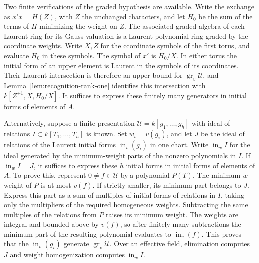 \documentclass[11pt,reqno]{amsart}
\numberwithin{equation}{section}
\theoremstyle{definition}
\theoremstyle{remark}
\begin{document}
Two finite verifications of the graded hypothesis are available.
Write the exchange as \(x'x=H(Z)\), with \(Z\) the unchanged
characters, and let \(H_0\) be the sum of the terms of \(H\)
minimizing the weight on \(Z\). The associated graded algebra of
each Laurent ring for its Gauss valuation is a Laurent polynomial
ring graded by the coordinate weights. Write \(X,Z\) for the
coordinate symbols of the first torus, and evaluate \(H_0\) in
these symbols. The symbol of \(x'\) is \(H_0/X\). In either torus
the initial form of an upper element is Laurent in the symbols of
its coordinates. Their Laurent intersection is therefore an upper
bound for \(\operatorname{gr}_v\mathcal U\), and
Lemma~\ref{lem:recognition-rank-one} identifies this intersection
with \(k[Z^{\pm1},X,H_0/X]\). It suffices to express these finitely
many generators in initial forms of elements of \(A\).

Alternatively, suppose a finite presentation
\(\mathcal U=k[g_1,\ldots,g_h]\) with ideal of relations
\(I\subset k[T_1,\ldots,T_h]\) is known. Set \(w_i=v(g_i)\),
and let \(J\) be the ideal of relations of the Laurent initial
forms \(\operatorname{in}_v(g_i)\) in one chart. Write
\(\operatorname{in}_w I\) for the ideal generated by the minimum-weight
parts of the nonzero polynomials in \(I\). If
\(\operatorname{in}_w I=J\), it suffices to express these \(h\)
initial forms in initial forms of elements of \(A\). To prove this,
represent \(0\ne f\in\mathcal U\) by a polynomial \(P(T)\).
The minimum \(w\)-weight of \(P\) is at most \(v(f)\). If strictly
smaller, its minimum part belongs to \(J\). Express this part as a
sum of multiples of initial forms of relations in \(I\), taking
only the multipliers of the required homogeneous weights.
Subtracting the same multiples of the relations from \(P\) raises
its minimum weight. The weights are integral and bounded above by
\(v(f)\), so after finitely many subtractions the minimum part of
the resulting polynomial evaluates to \(\operatorname{in}_v(f)\).
This proves that the \(\operatorname{in}_v(g_i)\) generate
\(\operatorname{gr}_v\mathcal U\). Over an effective field, elimination
computes \(J\) and weight homogenization computes \(\operatorname{in}_w I\).
\end{document}
